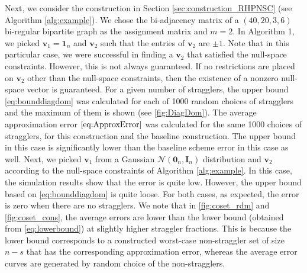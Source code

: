 \documentclass[journal,draftcls,onecolumn]{IEEEtran}
\theoremstyle{mystyle}
\newcommand{\bfI}{\mathbf{I}}
\newcommand{\bfv}{\mathbf{v}}
\newcommand{\aditya}[1]{\marginpar{+}{\bf Aditya's remark}: {\em #1}}
\newcommand{\sifat}[1]{\marginpar{+}{\bf Sifat's remark}: {\em #1}}
\begin{document}
Next, we consider the construction in Section \ref{sec:construction_RHPNSC} (see Algorithm \ref{alg:example}). We chose the bi-adjacency matrix of a $(40,20,3,6)$ bi-regular bipartite graph as the assignment matrix and $m = 2$.
In Algorithm 1, we picked $\mathbf{v}_1 = \mathbf{1}_n$ and $\mathbf{v}_2$ such that the entries of $\mathbf{v}_2$ are $\pm 1$. Note that in this particular case, we were successful in finding a $\bfv_2$ that satisfied the null-space constraints. However, this is not always guaranteed. If no restrictions are placed on $\bfv_2$ other than the null-space constraints, then the existence of a nonzero null-space vector is guaranteed. %
For a given number of stragglers, the upper bound \eqref{eq:bounddiagdom} was calculated for each of 1000 random choices of stragglers and the maximum of them is shown (see \autoref{fig:DiagDom}). The average approximation error $\eqref{eq:ApproxError}$ was calculated for the same 1000 choices of stragglers, for this construction and the baseline construction. The upper bound in this case is significantly lower than the baseline scheme error in this case as well.
Next, we picked $\mathbf{v}_1$ from a Gaussian $\mathcal{N}(\mathbf{0}_n,\bfI_n)$ distribution and $\bfv_2$ according to the null-space constraints of Algorithm \ref{alg:example}. In this case, the simulation results show that the error is quite low. However, the upper bound based on \eqref{eq:bounddiagdom} is quite loose. For both cases, as expected, the error is zero when there are no stragglers. We note that in \autoref{fig:coset_rdm} and \autoref{fig:coset_cons}, the average errors are lower than the lower bound (obtained from \eqref{eq:lowerbound}) at slightly higher straggler fractions. This is because the lower bound corresponds to a constructed worst-case non-straggler set of size $n-s$ that has the corresponding approximation error, whereas the average error curves are generated by random choice of the non-stragglers. 

\end{document}
